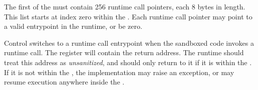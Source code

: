 


\specitem
The first  of the  must contain 256 runtime call pointers, each 8 bytes in length. This list starts at index zero within the . Each runtime call pointer may point to a valid entrypoint in the runtime, or be zero.

\specitem
Control switches to a runtime call entrypoint when the sandboxed code invokes a runtime call. The  register will contain the return address. The runtime should treat this address as \textit{unsanitized}, and should only return to it if it is within the . If it is not within the , the implementation may raise an exception, or may resume execution anywhere inside the .
